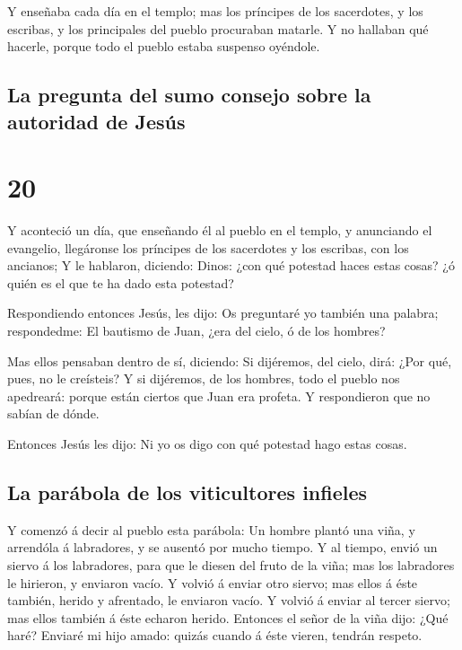 Y enseñaba cada día en el templo; mas los príncipes de
los sacerdotes, y los escribas, y los principales del pueblo procuraban
matarle.  Y no hallaban qué hacerle, porque todo el
pueblo estaba suspenso oyéndole.

\hypertarget{la-pregunta-del-sumo-consejo-sobre-la-autoridad-de-jesuxfas}{%
\subsection{La pregunta del sumo consejo sobre la autoridad de
Jesús}\label{la-pregunta-del-sumo-consejo-sobre-la-autoridad-de-jesuxfas}}

\hypertarget{section-19}{%
\section{20}\label{section-19}}

 Y aconteció un día, que enseñando él al pueblo en el
templo, y anunciando el evangelio, llegáronse los príncipes de los
sacerdotes y los escribas, con los ancianos;  Y le
hablaron, diciendo: Dinos: ¿con qué potestad haces estas cosas? ¿ó quién
es el que te ha dado esta potestad?

 Respondiendo entonces Jesús, les dijo: Os preguntaré yo
también una palabra; respondedme:  El bautismo de Juan,
¿era del cielo, ó de los hombres?

 Mas ellos pensaban dentro de sí, diciendo: Si dijéremos,
del cielo, dirá: ¿Por qué, pues, no le creísteis?  Y si
dijéremos, de los hombres, todo el pueblo nos apedreará: porque están
ciertos que Juan era profeta.  Y respondieron que no
sabían de dónde.

 Entonces Jesús les dijo: Ni yo os digo con qué potestad
hago estas cosas.

\hypertarget{la-paruxe1bola-de-los-viticultores-infieles}{%
\subsection{La parábola de los viticultores
infieles}\label{la-paruxe1bola-de-los-viticultores-infieles}}

 Y comenzó á decir al pueblo esta parábola: Un hombre
plantó una viña, y arrendóla á labradores, y se ausentó por mucho
tiempo.  Y al tiempo, envió un siervo á los labradores,
para que le diesen del fruto de la viña; mas los labradores le hirieron,
y enviaron vacío.  Y volvió á enviar otro siervo; mas
ellos á éste también, herido y afrentado, le enviaron vacío.
 Y volvió á enviar al tercer siervo; mas ellos también á
éste echaron herido.  Entonces el señor de la viña dijo:
¿Qué haré? Enviaré mi hijo amado: quizás cuando á éste vieren, tendrán
respeto.

